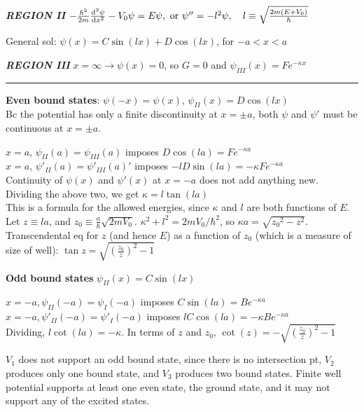 \smallskip

\textbf{\textit{REGION II}}
$-\frac{\hbar^2}{2m} \dv[2]{\psi}{x} - V_0 \psi = E \psi, \textrm{ or } \psi'' = -l^2 \psi, \quad l \equiv \sqrt{\frac{2m (E + V_0)}{\hbar}}$

General sol: $\psi(x) = C \sin(lx) + D \cos(lx)$, for $-a < x < a$

\smallskip

\textbf{\textit{REGION III}} 
$x = \infty \rightarrow \psi(x) = 0$, so $G=0$ and $\psi_{III}(x) = Fe^{-\kappa x}$

\medskip
\hrule height 0.3pt \thinspace

\textbf{Even bound states}:
$\psi(-x) = \psi(x)$, $\psi_{II}(x) = D \cos(lx)$ \\
Bc the potential has only a finite discontinuity at $x = \pm a$, both $\psi$ and $\psi'$ must be continuous at $x = \pm a$.

$x = a$, $\psi_{II}(a) = \psi_{III}(a)$ imposes $D \cos(la) = F e^{-\kappa a}$ \\

$x = a$, $\psi'_{II}(a) = \psi'_{III}(a)'$ imposes $-lD \sin(la) = -\kappa F e^{-\kappa a}$ \\

Continuity of $\psi(x)$ and $\psi'(x)$ at $x = -a$ does not add anything new. \\

Dividing the above two, we get $\kappa = l \tan(la)$ \\
This is a formula for the allowed energies, since $\kappa$ and $l$ are both functions of $E$. Let $z \equiv la$, and $z_0 \equiv \frac{a}{\hbar} \sqrt{2m V_0}$. $\kappa^2 + l^2 = 2m V_0 / \hbar^2$, so $\kappa a = \sqrt{{z_0}^2 - z^2}$. \\

Transcendental eq for $z$ (and hence $E$) as a function of $z_0$ (which is a measure of size of well): $\tan z = \sqrt{(\frac{z_0}{z})^2 - 1}$

\textbf{Odd bound states}
$\psi_{II}(x) = C \sin(lx)$

$x = -a, \psi_{II}(-a) = \psi_{I}(-a)$ imposes $C \sin(la) = B e^{-\kappa a}$ \\
$x = -a, \psi'_{II}(-a) = \psi'_{I}(-a)$ imposes $l C \cos(la) = -\kappa B e^{-\kappa a}$ \\

Dividing, $l \cot(la) = -\kappa$. 
In terms of $z$ and $z_0$, $\cot(z) = - \sqrt{(\frac{z_0}{z})^2 - 1}$

$V_{1}$ does not support an odd bound state, since there is no intersection pt, $V_{2}$ produces only one bound state, and $V_{3}$ produces two bound states. Finite well potential supports at least one even state, the ground state, and it may not support any of the excited states.

